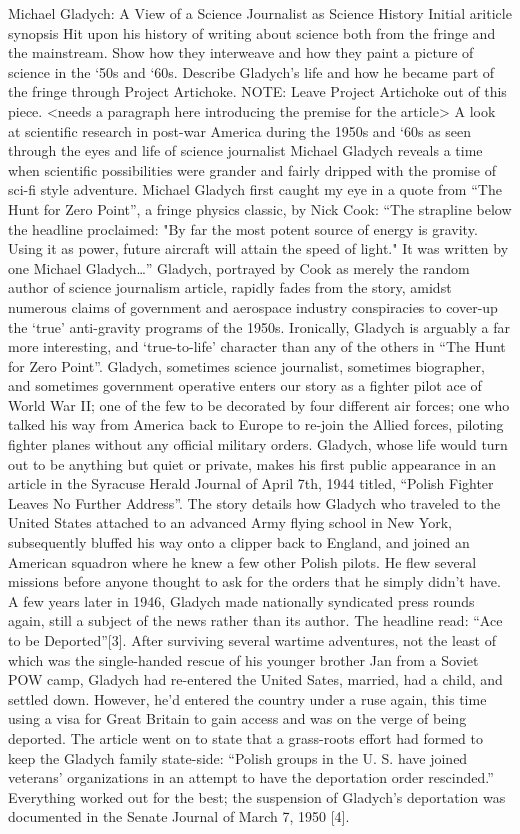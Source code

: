 Michael Gladych: A View of a Science Journalist as Science History
Initial ariticle synopsis
Hit upon his history of writing about science both from the fringe and the mainstream.  Show how they interweave and how they paint a picture of science in the ‘50s and ‘60s.  Describe Gladych’s life and how he became part of the fringe through Project Artichoke.  NOTE:  Leave Project Artichoke out of this piece.
<needs a paragraph here introducing the premise for the article>
A look at scientific research in post-war America during the 1950s and ‘60s as seen through the eyes and life of science journalist Michael Gladych reveals a time when scientific possibilities were grander and fairly dripped with the promise of sci-fi style adventure.
Michael Gladych first caught my eye in a quote from “The Hunt for Zero Point”, a fringe physics classic, by Nick Cook: 
“The strapline below the headline proclaimed: "By far the most potent source of energy is gravity. Using it as power, future aircraft will attain the speed of light." It was written by one Michael Gladych…”
Gladych, portrayed by Cook as merely the random author of science journalism article, rapidly fades from the story, amidst numerous claims of government and aerospace industry conspiracies to cover-up the ‘true’ anti-gravity programs of the 1950s.  Ironically, Gladych is arguably a far more interesting, and ‘true-to-life’ character than any of the others in “The Hunt for Zero Point”.  Gladych, sometimes science journalist, sometimes biographer, and sometimes government operative enters our story as a fighter pilot ace of World War II; one of the few to be decorated by four different air forces; one who talked his way from America back to Europe to re-join the Allied forces, piloting fighter planes without any official military orders.  Gladych, whose life would turn out to be anything but quiet or private, makes his first public appearance in an article in the Syracuse Herald Journal of April 7th, 1944 titled, “Polish Fighter Leaves No Further Address”.  The story details how Gladych who traveled to the United States attached to an advanced Army flying school in New York, subsequently bluffed his way onto a clipper back to England, and joined an American squadron where he knew a few other Polish pilots.  He flew several missions before anyone thought to ask for the orders that he simply didn’t have.
A few years later in 1946, Gladych made nationally syndicated press rounds again, still a subject of the news rather than its author.  The headline read: “Ace to be Deported”[3].  After surviving several wartime adventures, not the least of which was the single-handed rescue of his younger brother Jan from a Soviet POW camp, Gladych had re-entered the United Sates, married, had a child, and settled down.  However, he’d entered the country under a ruse again, this time using a visa for Great Britain to gain access and was on the verge of being deported. The article went on to state that a grass-roots effort had formed to keep the Gladych family state-side: “Polish groups in the U. S. have joined veterans' organizations in an attempt to have the deportation order rescinded.”  Everything worked out for the best; the suspension of Gladych’s deportation was documented in the Senate Journal of March 7, 1950 [4]. 
